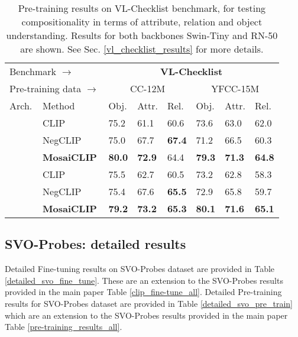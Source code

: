 \documentclass[11pt]{article}
\newcommand{\methodcompbold}{\textbf{MosaiCLIP}}
\newcommand{\clip}{CLIP}
\newcommand{\negclip}{NegCLIP}
\begin{document}
  \begin{table}[h!]
  \fontsize{8.}{10pt}\selectfont
      \centering
      \begin{tabular}{p{0.4cm}lp{0.4cm}p{0.4cm}p{0.4cm}|p{0.4cm}p{0.4cm}p{0.4cm}}
          \toprule
          \multicolumn{2}{l}{Benchmark $\rightarrow$} & \multicolumn{6}{c}{\textbf{VL-Checklist}}\\
          \cmidrule(lr){3-8}
          \multicolumn{2}{l}{Pre-training data $\rightarrow$} & \multicolumn{3}{c|}{CC-12M} & \multicolumn{3}{c}{YFCC-15M}\\
          \cmidrule(lr){3-5} \cmidrule(lr){6-8}
          {Arch.} & Method & Obj. & Attr. & Rel.  & Obj. & Attr. & Rel.  \\
          \midrule
          & \clip{} & 75.2  &  61.1 & 60.6  & 73.6 &   63.0 & 62.0  \\[1pt]
          & \negclip{} & 75.0 &  67.7 & \textbf{67.4}  & 71.2 &   66.5 & 60.3  \\[1pt]
          \rowcolor{cyan!12}
          \cellcolor{white} \multirow{-3}{*}{\rotatebox[origin=c]{90}{Swin-T}} & \methodcompbold{} & \textbf{80.0}  &  \textbf{72.9} & 64.4  & \textbf{79.3} &   \textbf{71.3} & \textbf{64.8}  \\[1pt]
\midrule
          & \clip{} & 75.5 & 62.7 & 60.5  & 73.2 &   62.8 & 58.3  \\[1pt]
          & \negclip{} & 75.4 & 67.6 & \textbf{65.5}  & 72.9 &   65.8 & 59.7  \\[1pt]
          \rowcolor{cyan!12}
          \cellcolor{white} \multirow{-3}{*}{\rotatebox[origin=c]{90}{RN-50}} & \methodcompbold{} & \textbf{79.2} & \textbf{73.2} & \textbf{65.3}  & \textbf{80.1} &   \textbf{71.6} & \textbf{65.1}  \\[1pt]
\bottomrule
      \end{tabular}
    
      \caption{Pre-training results on {\color{blue} VL-Checklist} benchmark, for testing compositionality in terms of attribute, relation and object understanding. Results for both backbones Swin-Tiny and RN-50 are shown. See Sec. \ref{vl_checklist_results} for more details.}
      \label{vl_checklist_results_pretrain}
  \end{table}

\subsection{SVO-Probes: detailed results}
\label{svo_detailed_results}
Detailed Fine-tuning results on SVO-Probes dataset are provided in Table \ref{detailed_svo_fine_tune}. These are an extension to the SVO-Probes results provided in the main paper Table \ref{clip_fine-tune_all}. Detailed Pre-training results for SVO-Probes dataset are provided in Table \ref{detailed_svo_pre_train} which are an extension to the SVO-Probes results provided in the main paper Table \ref{pre-training_results_all}.
\end{document}
